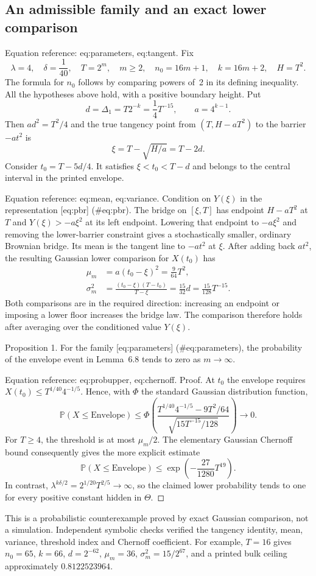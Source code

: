 \documentclass[10pt]{article}
\begin{document}
\subsection*{An admissible family and an exact lower comparison}
Equation reference: eq:parameters, eq:tangent. Fix \[
 \lambda=4,\quad \delta=\frac1{40},\quad T=2^m,\quad m\geq2,
 \quad n_0=16m+1,\quad k=16m+2,\quad H=T^2.\] The formula for \(n_0\) follows by comparing powers of 2 in its defining inequality. All the hypotheses above hold, with a positive boundary height. Put \[d=\Delta_1=T2^{-k}=\frac14T^{-15},
 \qquad a=4^{k-1}.\] Then \(ad^2=T^2/4\) and the true tangency point from \((T,H-aT^2)\) to the barrier \(-at^2\) is \[
 \xi=T-\sqrt{H/a}=T-2d.\] Consider \(t_0=T-5d/4\). It satisfies \(\xi<t_0<T-d\) and belongs to the central interval in the printed envelope.\par
Equation reference: eq:mean, eq:variance. Condition on \(Y(\xi)\) in the representation [eq:pbr] (\#eq:pbr). The bridge on \([\xi,T]\) has endpoint \(H-aT^2\) at \(T\) and \(Y(\xi)>-a\xi^2\) at its left endpoint. Lowering that endpoint to \(-a\xi^2\) and removing the lower-barrier constraint gives a stochastically smaller, ordinary Brownian bridge. Its mean is the tangent line to \(-at^2\) at \(\xi\). After adding back \(at^2\), the resulting Gaussian lower comparison for \(X(t_0)\) has \[\begin{aligned}
 \mu_m&=a(t_0-\xi)^2=\frac9{64}T^2, \\
 \sigma_m^2&=\frac{(t_0-\xi)(T-t_0)}{T-\xi}
           =\frac{15}{32}d=\frac{15}{128}T^{-15}.
 \end{aligned}\] Both comparisons are in the required direction: increasing an endpoint or imposing a lower floor increases the bridge law. The comparison therefore holds after averaging over the conditioned value \(Y(\xi)\).\par
Proposition 1.  For the family [eq:parameters] (\#eq:parameters), the probability of the envelope event in Lemma 6.8 tends to zero as \(m\to\infty\).\par
Equation reference: eq:probupper, eq:chernoff. Proof. At \(t_0\) the envelope requires \(X(t_0)\leq
T^{1/40}4^{-1/5}\). Hence, with \(\Phi\) the standard Gaussian distribution function, \[
 \mathbb P(X\leq\mathrm{Envelope})
 \leq
 \Phi\!\left(
 \frac{T^{1/40}4^{-1/5}-9T^2/64}
      {\sqrt{15T^{-15}/128}}\right)\longrightarrow0.\] For \(T\geq4\), the threshold is at most \(\mu_m/2\). The elementary Gaussian Chernoff bound consequently gives the more explicit estimate \[
 \mathbb P(X\leq\mathrm{Envelope})
 \leq \exp\!\left(-\frac{27}{1280}T^{19}\right).\] In contrast, \(\lambda^{k\delta/2}=2^{1/20}T^{2/5}\to\infty\), so the claimed lower probability tends to one for every positive constant hidden in \(\Theta\). ◻\par
This is a probabilistic counterexample proved by exact Gaussian comparison, not a simulation. Independent symbolic checks verified the tangency identity, mean, variance, threshold index and Chernoff coefficient. For example, \(T=16\) gives \(n_0=65\), \(k=66\), \(d=2^{-62}\), \(\mu_m=36\), \(\sigma_m^2=15/2^{67}\), and a printed bulk ceiling approximately \(0.8122523964\).\par
\end{document}
